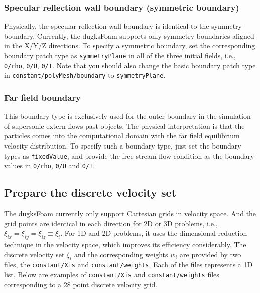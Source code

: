 \subsubsection{Specular reflection wall boundary (symmetric boundary)}
Physically, the specular reflection wall boundary is identical to the symmetry boundary.
Currently, the dugksFoam supports only symmetry boundaries aligned in the X/Y/Z directions.
To specify a symmetric boundary, set the corresponding boundary patch type as \verb|symmetryPlane| in all of the three initial fields, i.e., \verb|0/rho|, \verb|0/U|, \verb|0/T|.
Note that you should also change the basic boundary patch type in \verb|constant/polyMesh/boundary| to \verb|symmetryPlane|.

\subsubsection{Far field boundary}
This boundary type is exclusively used for the outer boundary in the simulation of supersonic extern flows past objects.
The physical interpretation is that the particles comes into the computational domain with the far field equilibrium velocity distribution.
To specify such a boundary type, just set the boundary types as \verb|fixedValue|, and provide the free-stream flow condition as the boundary values in
\verb|0/rho|, \verb|0/U| and \verb|0/T|.

\subsection{Prepare the discrete velocity set}
\label{sec_dv}
The dugksFoam currently only support Cartesian grids in velocity space.
And the grid points are identical in each direction for 2D or 3D problems, i.e., $\xi_{ix} = \xi_{iy} = \xi_{iz} \equiv \xi_i$.
For 1D and 2D problems, it uses the dimensional reduction technique in the velocity space, which improves its efficiency considerably.
The discrete velocity set $\xi_i$ and the corresponding weights $w_i$ are provided by two files,
the \verb|constant/Xis| and \verb|constant/weights|. Each of the files represents a 1D list.
Below are examples of \verb|constant/Xis| and \verb|constant/weights| files corresponding to a 28 point discrete velocity grid.

